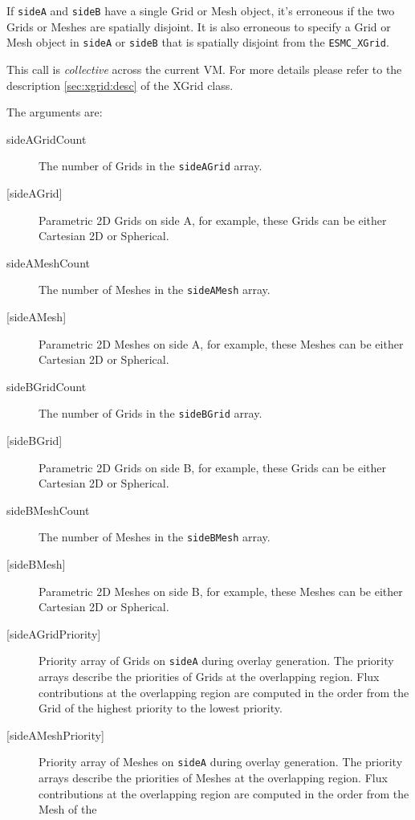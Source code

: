     If {\tt sideA} and {\tt sideB} have a single 
    Grid or Mesh object, it's erroneous
    if the two Grids or Meshes are spatially disjoint. 
    It is also erroneous to specify a Grid or Mesh object in {\tt sideA} or {\tt sideB}
    that is spatially disjoint from the {\tt ESMC\_XGrid}. 
  
    This call is {\em collective} across the current VM. For more details please refer to the description 
    \ref{sec:xgrid:desc} of the XGrid class. 
  
       The arguments are:
       \begin{description}
       \item [sideAGridCount]
             The number of Grids in the {\tt sideAGrid} array.
       \item [{[sideAGrid]}]
             Parametric 2D Grids on side A, for example, 
             these Grids can be either Cartesian 2D or Spherical.
       \item [sideAMeshCount]
             The number of Meshes in the {\tt sideAMesh} array.
       \item [{[sideAMesh]}]
             Parametric 2D Meshes on side A, for example, 
             these Meshes can be either Cartesian 2D or Spherical.
       \item [sideBGridCount]
             The number of Grids in the {\tt sideBGrid} array.
       \item [{[sideBGrid]}]
             Parametric 2D Grids on side B, for example, 
             these Grids can be either Cartesian 2D or Spherical.
       \item [sideBMeshCount]
             The number of Meshes in the {\tt sideBMesh} array.
       \item [{[sideBMesh]}]
             Parametric 2D Meshes on side B, for example, 
             these Meshes can be either Cartesian 2D or Spherical.
       \item [{[sideAGridPriority]}]
             Priority array of Grids on {\tt sideA} during overlay generation.
             The priority arrays describe the priorities of Grids at the overlapping region.
             Flux contributions at the overlapping region are computed in the order from the Grid of the
             highest priority to the lowest priority.
       \item [{[sideAMeshPriority]}]
             Priority array of Meshes on {\tt sideA} during overlay generation.
             The priority arrays describe the priorities of Meshes at the overlapping region.
             Flux contributions at the overlapping region are computed in the order from the Mesh of the

\end{description}
